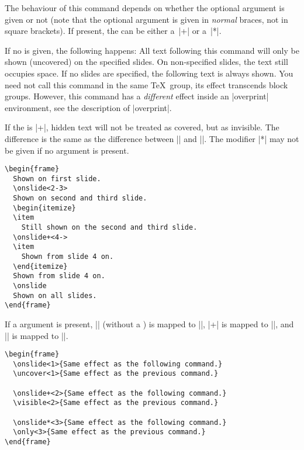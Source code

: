 \begin{command}{\onslide{}}
  The behaviour of this command depends on whether the optional argument  is given or not (note that the optional argument is given in \emph{normal} braces, not in square brackets). If present, the  can be either a~|+| or a~|*|.

  If no  is given, the following happens: All text following this command will only be shown  (uncovered) on the specified slides. On non-specified slides, the text still occupies space. If no slides are specified, the following text is always shown. You need not call this command in the same \TeX\ group, its effect transcends block groups. However, this command has a \emph{different} effect inside an |overprint| environment, see the description of |overprint|.

  If the  is |+|, hidden text will not be treated as covered, but as invisible. The difference is the same as the difference between |\uncover| and |\visible|. The modifier |*| may not be given if no  argument is present.

  \example
\begin{verbatim}
\begin{frame}
  Shown on first slide.
  \onslide<2-3>
  Shown on second and third slide.
  \begin{itemize}
  \item
    Still shown on the second and third slide.
  \onslide+<4->
  \item
    Shown from slide 4 on.
  \end{itemize}
  Shown from slide 4 on.
  \onslide
  Shown on all slides.
\end{frame}
\end{verbatim}

  If a  argument is present, |\onslide| (without a ) is mapped to |\uncover|, |\onslide+| is mapped to |\visible|, and |\onslide*| is mapped to |\only|.

  \example
\begin{verbatim}
\begin{frame}
  \onslide<1>{Same effect as the following command.}
  \uncover<1>{Same effect as the previous command.}

  \onslide+<2>{Same effect as the following command.}
  \visible<2>{Same effect as the previous command.}

  \onslide*<3>{Same effect as the following command.}
  \only<3>{Same effect as the previous command.}
\end{frame}
\end{verbatim}
\end{command}


